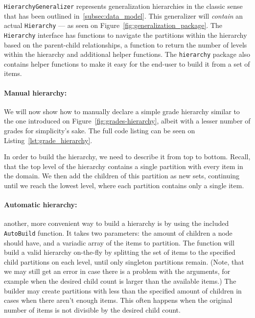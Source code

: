 \texttt{HierarchyGeneralizer} represents generalization hierarchies in the classic sense that has been outlined in~\ref{subsec:data_model}.
This generalizer will \textit{contain} an actual \texttt{Hierarchy} --- as seen on Figure~\ref{fig:generalization_package}.
The \texttt{Hierarchy} interface has functions to navigate the partitions within the hierarchy based on the parent-child relationships, a function to return the number of levels within the hierarchy and additional helper functions.
The \texttt{hierarchy} package also contains helper functions to make it easy for the end-user to build it from a set of items.

\paragraph{Manual hierarchy:} We will now show how to manually declare a simple grade hierarchy similar to the one introduced on Figure~\ref{fig:grades-hierarchy}, albeit with a lesser number of grades for simplicity's sake. The full code listing can be seen on Listing~\ref{lst:grade_hierarchy}.



In order to build the hierarchy, we need to describe it from top to bottom.
Recall, that the top level of the hierarchy contains a single partition with every item in the domain.
We then add the children of this partition as new sets, continuing until we reach the lowest level, where each partition contains only a single item.

\paragraph{Automatic hierarchy:} another, more convenient way to build a hierarchy is by using the included \texttt{AutoBuild} function. It takes two parameters: the amount of children a node should have, and a variadic array of the items to partition. The function will build a valid hierarchy on-the-fly by splitting the set of items to the specified child partitions on each level, until only singleton partitions remain. (Note, that we may still get an error in case there is a problem with the arguments, for example when the desired child count is larger than the available items.) The builder may create partitions with less than the specified amount of children in cases when there aren't enough items. This often happens when the original number of items is not divisible by the desired child count.


